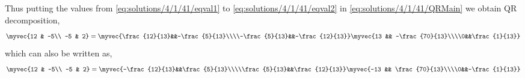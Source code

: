 Thus putting the values from \eqref{eq:solutions/4/1/41/eqval1} to \eqref{eq:solutions/4/1/41/eqval2} in \eqref{eq:solutions/4/1/41/QRMain} we obtain QR decomposition,
\begin{align}
    \myvec{12 & -5\\ -5 & 2} =\myvec{\frac{12}{13}&&-\frac{5}{13}\\\\-\frac{5}{13}&&-\frac{12}{13}}\myvec{13 && -\frac{70}{13}\\\\0&&\frac{1}{13}}
\end{align}
which can also be written as,
\begin{align}
  \myvec{12 & -5\\ -5 & 2} =\myvec{-\frac{12}{13}&&\frac{5}{13}\\\\\frac{5}{13}&&\frac{12}{13}}\myvec{-13 && \frac{70}{13}\\\\0&&-\frac{1}{13}}
\end{align}
